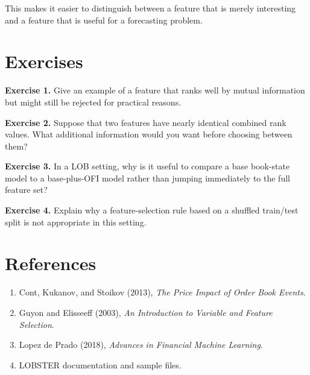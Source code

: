 \documentclass[11pt]{article}
\newcommand{\answerlines}[1]{\vspace{#1\baselineskip}}
\begin{document}
This makes it easier to distinguish between a feature that is merely
interesting and a feature that is useful for a forecasting problem.

\section*{Exercises}

\textbf{Exercise 1.} Give an example of a feature that ranks well by mutual
information but might still be rejected for practical reasons.

\answerlines{6}

\textbf{Exercise 2.} Suppose that two features have nearly identical combined
rank values. What additional information would you want before choosing between
them?

\answerlines{6}

\textbf{Exercise 3.} In a LOB setting, why is it useful to compare a base
book-state model to a base-plus-OFI model rather than jumping immediately to
the full feature set?

\answerlines{6}

\textbf{Exercise 4.} Explain why a feature-selection rule based on a shuffled
train/test split is not appropriate in this setting.

\answerlines{6}

\section*{References}

\begin{enumerate}
  \item Cont, Kukanov, and Stoikov (2013), \textit{The Price Impact of Order Book Events}.
  \item Guyon and Elisseeff (2003), \textit{An Introduction to Variable and Feature Selection}.
  \item Lopez de Prado (2018), \textit{Advances in Financial Machine Learning}.
  \item LOBSTER documentation and sample files.
\end{enumerate}
\end{document}
